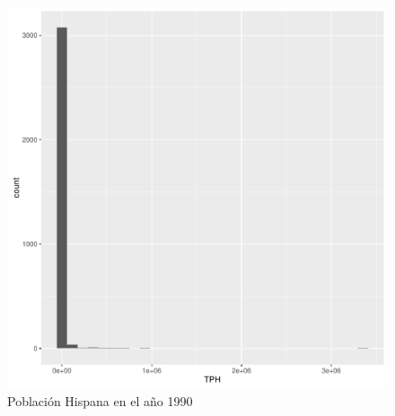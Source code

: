 \documentclass[conference]{IEEEtran}\usepackage[]{graphicx}\usepackage[]{color}
\makeatletter
\def\maxwidth{ %
  \ifdim\Gin@nat@width>\linewidth
    \linewidth
  \else
    \Gin@nat@width
  \fi
}
\newenvironment{knitrout}{}{} %
\makeatother
\begin{document}
\begin{figure}[H]
	\centering
\begin{knitrout}
\color{fgcolor}
\includegraphics[width=\maxwidth]{figure/pobHis1990-1} 

\end{knitrout}
	\caption{Población Hispana en el año 1990}
\end{figure}
\end{document}

